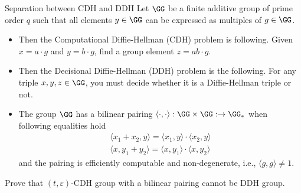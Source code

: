 \documentclass{crypto-exercise}
\author{Sven Laur}
\begin{document}
\begin{exercise}{Separation between CDH and DDH}
  Let $\GG$ be a finite additive group of prime order $q$ such that all elements $y\in\GG$ can be
  expressed as multiples of $g\in\GG$.
  \begin{itemize}
  \item  Then the Computational
  Diffie-Hellman (CDH) problem is following. Given $x=a\cdot g$ and
  $y=b\cdot g$, find a group element $z=ab\cdot g$. 
  \item Then the Decisional
  Diffie-Hellman (DDH) problem is the following. For any triple
  $x,y,z\in\GG$, you must decide whether it is a Diffie-Hellman triple
  or not.
  \item The group $\GG$ has a bilinear pairing $\langle\cdot,\cdot \rangle: \GG\times\GG:\to\GG_*$ when following equalities hold
  \begin{align*}
     \langle x_1+x_2,y\rangle= \langle x_1,y\rangle\cdot \langle x_2,y\rangle\\
     \langle x,y_1+y_2\rangle= \langle x,y_1\rangle\cdot \langle x,y_2\rangle
  \end{align*}
  and the pairing is efficiently computable and non-degenerate, i.e., $\langle g,g \rangle\neq 1$.
  \end{itemize}
  Prove that $(t,\varepsilon)$-CDH group with a bilinear pairing cannot be DDH group.  
  \end{exercise}
\begin{solution}

\end{solution}
\end{document}
